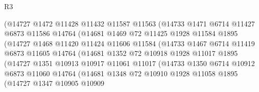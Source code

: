 \begin{lexlean}{R3}
\begin{coremodule}
                        (@14727
                          @1472
                          @11428
                          @11432
                          @11587
                          @11563
                          (@14733
                            @1471
                            @6714
                            @11427
                            @6873
                            @11586
                            @14764
                            (@14681
                              @1469
                              @72
                              @11425
                              @1928
                              @11584
                              @1895
                              (@14727
                                @1468
                                @11420
                                @11424
                                @11606
                                @11584
                                (@14733
                                  @1467
                                  @6714
                                  @11419
                                  @6873
                                  @11605
                                  @14764
                                  (@14681
                                    @1352
                                    @72
                                    @10918
                                    @1928
                                    @11017
                                    @1895
                                    (@14727
                                      @1351
                                      @10913
                                      @10917
                                      @11061
                                      @11017
                                      (@14733
                                        @1350
                                        @6714
                                        @10912
                                        @6873
                                        @11060
                                        @14764
                                        (@14681
                                          @1348
                                          @72
                                          @10910
                                          @1928
                                          @11058
                                          @1895
                                          (@14727
                                            @1347
                                            @10905
                                            @10909

\end{coremodule}
\end{lexlean}
